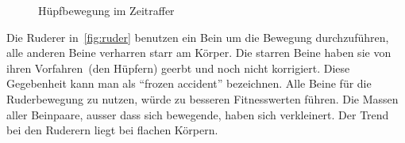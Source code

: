 \begin{figure}[H]
        \caption{Hüpfbewegung im Zeitraffer\label{fig:hupf}}

      \end{figure}

      Die Ruderer in~\vref{fig:ruder} benutzen ein Bein um die Bewegung durchzuführen,
      alle anderen Beine verharren starr am Körper.
      Die starren Beine haben sie von ihren Vorfahren~(den Hüpfern) geerbt und noch nicht korrigiert.
      Diese Gegebenheit kann man als ``frozen accident'' bezeichnen.
      Alle Beine für die Ruderbewegung zu nutzen, würde zu besseren Fitnesswerten führen.
      Die Massen aller Beinpaare, ausser dass sich bewegende, haben sich verkleinert.
      Der Trend bei den Ruderern liegt bei flachen Körpern.

      \begin{figure}[H]
        \centering


\end{figure}
